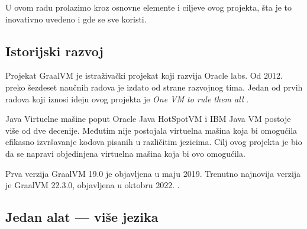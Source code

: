 \documentclass[a4paper]{article}
\begin{document}
U ovom radu prolazimo kroz osnovne elemente i ciljeve ovog projekta, šta je to inovativno uvedeno i gde se sve koristi. 

\subsection{Istorijski razvoj}
\label{subsec:istorija}

Projekat GraalVM je istraživački projekat koji razvija Oracle labs. Od 2012. preko šezdeset naučnih radova je izdato od strane razvojnog tima. Jedan od prvih radova koji iznosi ideju ovog projekta je \textit{One VM to rule them all} \cite{onevmtorulethemall}.

Java Virtuelne mašine poput Oracle Java HotSpotVM i IBM Java VM postoje više od dve decenije. Međutim nije postojala virtuelna mašina koja bi omogućila efikasno izvršavanje kodova pisanih u različitim jezicima. Cilj ovog projekta je bio da se napravi objedinjena virtuelna mašina koja bi ovo omogućila.

Prva verzija GraalVM 19.0 je objavljena u maju 2019. Trenutno najnovija verzija je GraalVM 22.3.0, objavljena u oktobru 2022. \cite{graalvmreleases}.

\subsection{Jedan alat --- više jezika}
\label{subsec:alatjezik}
\end{document}
